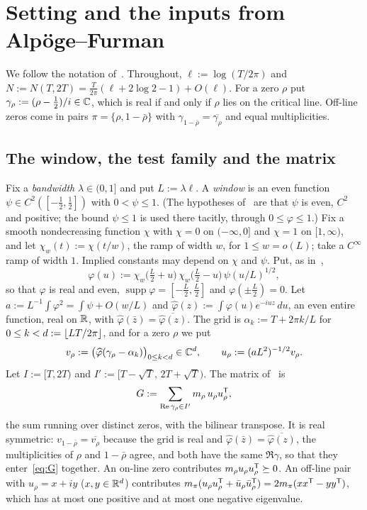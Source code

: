 \section{Setting and the inputs from Alp\"oge--Furman}\label{sec:setting}

We follow the notation of~\cite[\S\S1--2]{AF}. Throughout, $\ell:=\log(T/2\pi)$ and $N:=N(T,2T)=\frac T{2\pi}(\ell+2\log2-1)+O(\ell)$.
For a zero $\rho$ put $\gamma_\rho:=(\rho-\frac12)/i\in\mathbb C$, which is real if and only if $\rho$ lies on the critical line. Off-line zeros come in
pairs $\pi=\{\rho,1-\bar\rho\}$ with $\gamma_{1-\bar\rho}=\overline{\gamma_\rho}$ and equal multiplicities.

\subsection{The window, the test family and the matrix}\label{ssec:family}
Fix a \emph{bandwidth} $\lambda\in(0,1]$ and put $L:=\lambda\ell$. A \emph{window} is an even function $\psi\in C^2([-\frac12,\frac12])$ with
$0<\psi\le1$. (The hypotheses of~\cite[\S2.2]{AF} are that $\psi$ is even, $C^2$ and positive; the bound $\psi\le1$ is used there tacitly,
through $0\le\varphi\le1$.) Fix a smooth nondecreasing function $\chi$ with $\chi=0$ on $(-\infty,0]$ and $\chi=1$ on $[1,\infty)$, and let $\chi_w(t):=\chi(t/w)$, the
ramp of width $w$, for $1\le w=o(L)$; \cite{AF} take a $C^\infty$ ramp of width $1$. Implied constants may depend on $\chi$ and $\psi$. Put, as
in~\cite[(2.7)]{AF},
\begin{equation}\label{eq:window}
\varphi(u):=\chi_w\big(\tfrac L2+u\big)\,\chi_w\big(\tfrac L2-u\big)\,\psi(u/L)^{1/2},
\end{equation}
so that $\varphi$ is real and even, $\operatorname{supp}\varphi=[-\frac L2,\frac L2]$ and $\varphi(\pm\frac L2)=0$. Let
$a:=L^{-1}\int\varphi^2=\int\psi+O(w/L)$ and $\widehat\varphi(z):=\int\varphi(u)e^{-iuz}\,du$, an even entire function, real on $\mathbb R$, with
$\widehat\varphi(\bar z)=\overline{\widehat\varphi(z)}$. The grid is $\alpha_k:=T+2\pi k/L$ for $0\le k<d:=\lfloor LT/2\pi\rfloor$, and for a zero
$\rho$ we put
\[
v_\rho:=\big(\widehat\varphi(\gamma_\rho-\alpha_k)\big)_{0\le k<d}\in\mathbb C^d,\qquad u_\rho:=(aL^2)^{-1/2}v_\rho .
\]
Let $I:=[T,2T)$ and $I':=[T-\sqrt T,\,2T+\sqrt T)$. The matrix of~\cite[(2.10)]{AF} is
\begin{equation}\label{eq:G}
G:=\sum_{\operatorname{Re}\gamma_\rho\in I'}m_\rho\,u_\rho u_\rho^{\mathsf T},
\end{equation}
the sum running over distinct zeros, with the bilinear transpose. It is real symmetric: $v_{1-\bar\rho}=\overline{v_\rho}$ because the grid is
real and $\widehat\varphi(\bar z)=\overline{\widehat\varphi(z)}$, the multiplicities of $\rho$ and $1-\bar\rho$ agree, and both have the same
$\Re\gamma$, so that they enter~\eqref{eq:G} together. An on-line zero contributes $m_\rho u_\rho u_\rho^{\mathsf T}\succeq0$. An off-line pair with
$u_\rho=x+iy$ ($x,y\in\mathbb R^d$) contributes $m_\pi(u_\rho u_\rho^{\mathsf T}+\bar u_\rho\bar u_\rho^{\mathsf T})=2m_\pi(xx^{\mathsf T}-yy^{\mathsf T})$, which has at
most one positive and at most one negative eigenvalue.

